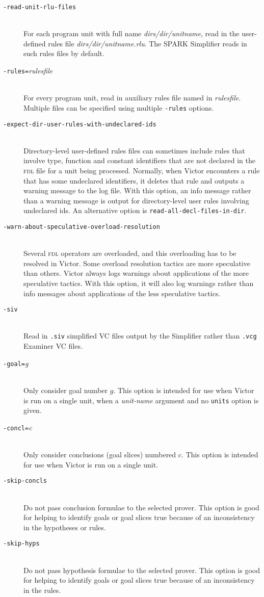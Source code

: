 \documentclass[12pt,fleqn]{article}
\newcommand{\fdl}{\textsc{fdl}}
\newcommand{\goalreportfile}{\textsc{vct}}
\newcommand{\optionb}[1]{\item[\texttt{-{#1}}]\ \\}
\newcommand{\optionv}[2]{\item[\texttt{-{#1}=}\mdseries\textit{#2}]\ \\}
\begin{document}
\begin{description}
  \optionb{read-unit-rlu-files}
  For each program unit with full name \textit{dirs/dir/unitname},
  read in the user-defined rules file \textit{dirs/dir/unitname.rlu}.  
  The SPARK Simplifier reads in such rules files by default.

  \optionv{rules}{rulesfile} For every program unit, read in
    auxiliary rules file named in \textit{rulesfile}.  Multiple files
    can be specified using multiple \texttt{-rules} options.

  \optionb{expect-dir-user-rules-with-undeclared-ids}
  Directory-level user-defined rules files can sometimes include rules
  that involve type, function and constant identifiers that are not
  declared in the \fdl{} file for a unit being processed.  Normally, when
  Victor encounters a rule that has some undeclared identifiers, it
  deletes that rule and outputs a warning message to the log file.
  With this option, an info message rather than a warning message is
  output for directory-level user rules involving undeclared ids.  An
  alternative option is \texttt{read-all-decl-files-in-dir}.

  \optionb{warn-about-speculative-overload-resolution}
  Several \fdl{} operators are overloaded, and this overloading has to be
  resolved in Victor.  Some overload resolution tactics are more 
  speculative than others. Victor always logs warnings about applications
  of the more speculative tactics. With this option, it will also 
  log warnings rather than info messages about applications of the 
  less speculative tactics.

  \optionb{siv} Read in \texttt{.siv} simplified VC files output by the
     Simplifier rather than \texttt{.vcg} Examiner VC files.

\optionv{goal}{g} Only consider goal number $g$.
  This option is intended for use when Victor is run on a single unit,
  when a \textit{unit-name} argument and no \texttt{units} option is
  given.

\optionv{concl}{c} Only consider conclusions (goal slices) numbered $c$.  
  This option is intended for use when Victor is run on a single unit.

\optionb{skip-concls}
  Do not pass conclusion formulae to the selected prover.  This option is
  good for helping to identify goals or goal slices true because of an
  inconsistency in the hypotheses or rules.

\optionb{skip-hyps}
  Do not pass hypothesis formulae to the selected prover.  This option is
  good for helping to identify goals or goal slices true because of an
  inconsistency in the rules.


\end{description}
\end{document}
